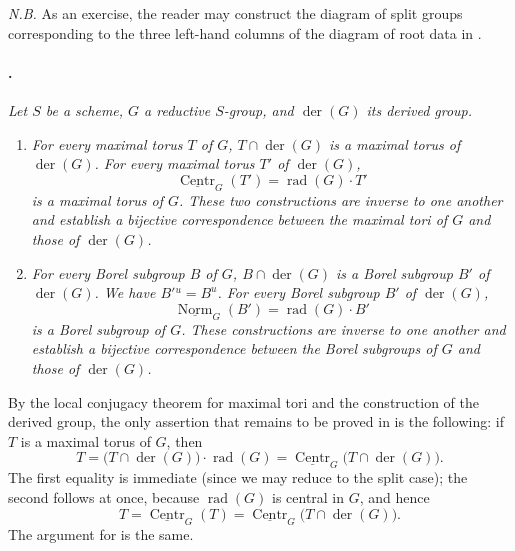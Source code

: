 \textit{N.B.} As an exercise, the reader may construct the diagram
of split groups corresponding to the three left-hand columns of
the diagram of root data in .

\paragraph{.}
\textit{Let \(S\) be a scheme, \(G\) a reductive \(S\)-group, and
\(\operatorname{der}(G)\) its derived group.}
\begin{enumerate}
\item[\textup{\SGAInlineRefTarget{sga3:xxii:prop:6.2.8:item:i}(i)}]
\textit{For every maximal torus \(T\) of \(G\),
\(T\cap\operatorname{der}(G)\) is a maximal torus of
\(\operatorname{der}(G)\). For every maximal torus \(T'\) of
\(\operatorname{der}(G)\),}
\[
  \underline{\operatorname{Centr}}_G(T')
  =
  \operatorname{rad}(G)\cdot T'
\]
\textit{is a maximal torus of \(G\). These two constructions are
inverse to one another and establish a bijective correspondence
between the maximal tori of \(G\) and those of
\(\operatorname{der}(G)\).}

\item[\textup{\SGAInlineRefTarget{sga3:xxii:prop:6.2.8:item:ii}(ii)}]
\textit{For every Borel subgroup \(B\) of \(G\),
\(B\cap\operatorname{der}(G)\) is a Borel subgroup \(B'\) of
\(\operatorname{der}(G)\). We have \(B'{}^u=B^u\). For every
Borel subgroup \(B'\) of \(\operatorname{der}(G)\),}
\[
  \underline{\operatorname{Norm}}_G(B')
  =
  \operatorname{rad}(G)\cdot B'
\]
\textit{is a Borel subgroup of \(G\). These constructions are
inverse to one another and establish a bijective correspondence
between the Borel subgroups of \(G\) and those of
\(\operatorname{der}(G)\).}
\end{enumerate}

By the local conjugacy theorem for maximal tori and the
construction of the derived group, the only assertion that
remains to be proved in \textup{} is the following: if \(T\)
is a maximal torus of \(G\), then
\[
  T
  =
  \bigl(T\cap\operatorname{der}(G)\bigr)\cdot
    \operatorname{rad}(G)
  =
  \underline{\operatorname{Centr}}_G
    \bigl(T\cap\operatorname{der}(G)\bigr).
\]
The first equality is immediate \textup{(since we may reduce to
the split case)}; the second follows at once, because
\(\operatorname{rad}(G)\) is central in \(G\), and hence
\[
  T
  =
  \underline{\operatorname{Centr}}_G(T)
  =
  \underline{\operatorname{Centr}}_G
    \bigl(T\cap\operatorname{der}(G)\bigr).
\]
The argument for \textup{} is the same.


